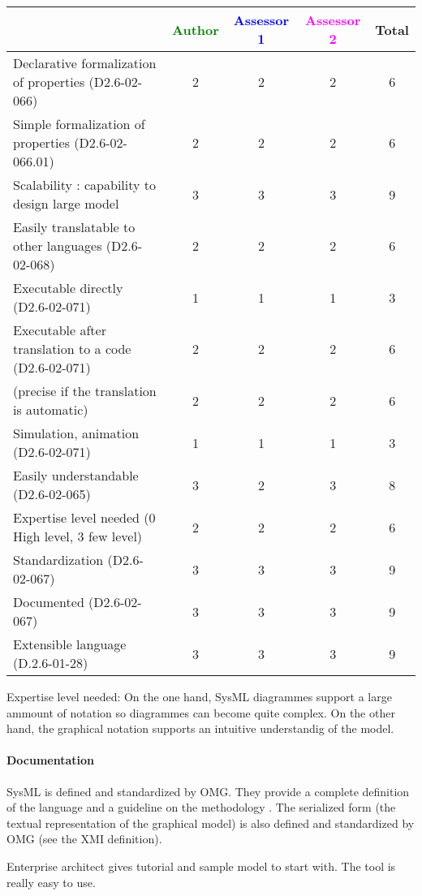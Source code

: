 \begin{tabular}{|l | c | c | c | c|}
\hline
& \textcolor{green}{Author} & \textcolor{blue}{Assessor 1} & \textcolor{magenta}{Assessor 2} & Total \\
\hline
Declarative formalization of properties (D2.6-02-066) & 2 & 2 & 2 & 6 \\
\hline
Simple formalization of properties (D2.6-02-066.01) &2 &2 & 2& 6 \\
\hline
Scalability : capability to design large model &3 &3 &3 & 9 \\
\hline
Easily translatable to other languages (D2.6-02-068) &2 &2 & 2& 6 \\
\hline
Executable directly (D2.6-02-071) &1 & 1& 1& 3 \\
\hline
Executable after translation to a code (D2.6-02-071) & 2 & 2& 2& 6 \\
(precise if the translation is automatic) &2 & 2& 2& 6 \\
\hline
Simulation, animation (D2.6-02-071) &1 & 1& 1& 3 \\
\hline
Easily understandable (D2.6-02-065) &3 & 2& 3& 8 \\
\hline
Expertise level needed (0 High level, 3 few level) &2 &2 & 2& 6 \\
\hline
Standardization (D2.6-02-067) &3 & 3& 3& 9 \\
\hline
Documented (D2.6-02-067) &3 & 3& 3& 9 \\
\hline
Extensible language (D.2.6-01-28) &3 & 3& 3& 9 \\
\hline
\end{tabular}
\begin{assessor2}
Expertise level needed: On the one hand, SysML diagrammes support a large ammount of notation so diagrammes can become quite complex. On the other hand, the graphical notation supports an intuitive understandig of the model.
\end{assessor2}

\paragraph{Documentation} 
SysML is  defined and standardized by OMG. They provide a complete
definition of the language and a guideline on the methodology
\cite{SysML}. The serialized form (the textual representation of the
graphical model) is also defined and standardized by OMG (see the XMI
definition).

Enterprise architect gives tutorial and sample model to start
with. The tool is really easy to use.

